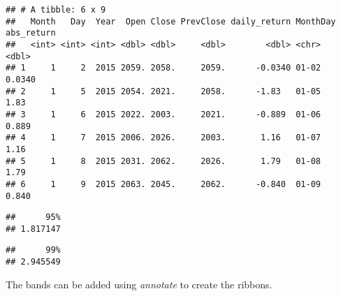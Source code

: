 \documentclass[]{book}
\newenvironment{Shaded}{\begin{snugshade}}{\end{snugshade}}
\newcommand{\FloatTok}[1]{\textcolor[rgb]{0.00,0.00,0.81}{#1}}
\newcommand{\KeywordTok}[1]{\textcolor[rgb]{0.13,0.29,0.53}{\textbf{#1}}}
\newcommand{\NormalTok}[1]{#1}
\newcommand{\OperatorTok}[1]{\textcolor[rgb]{0.81,0.36,0.00}{\textbf{#1}}}
\newcommand{\StringTok}[1]{\textcolor[rgb]{0.31,0.60,0.02}{#1}}
\begin{document}
\begin{Shaded}
\end{Shaded}

\begin{verbatim}
## # A tibble: 6 x 9
##   Month   Day  Year  Open Close PrevClose daily_return MonthDay abs_return
##   <int> <int> <int> <dbl> <dbl>     <dbl>        <dbl> <chr>         <dbl>
## 1     1     2  2015 2059. 2058.     2059.      -0.0340 01-02        0.0340
## 2     1     5  2015 2054. 2021.     2058.      -1.83   01-05        1.83  
## 3     1     6  2015 2022. 2003.     2021.      -0.889  01-06        0.889 
## 4     1     7  2015 2006. 2026.     2003.       1.16   01-07        1.16  
## 5     1     8  2015 2031. 2062.     2026.       1.79   01-08        1.79  
## 6     1     9  2015 2063. 2045.     2062.      -0.840  01-09        0.840
\end{verbatim}

\begin{Shaded}
\end{Shaded}

\begin{verbatim}
##      95% 
## 1.817147
\end{verbatim}

\begin{Shaded}
\end{Shaded}

\begin{verbatim}
##      99% 
## 2.945549
\end{verbatim}

The bands can be added using \emph{annotate} to create the ribbons.
\end{document}
